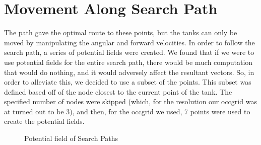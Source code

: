\documentclass{article}
\begin{document}
\section{Movement Along Search Path}
\label{movement_along}
The path gave the optimal route to these points, but the tanks can only be moved by manipulating the angular and forward velocities.  In order to follow the search path, a series of potential fields were created.  We found that if we were to use potential fields for the entire search path, there would be much computation that would do nothing, and it would adversely affect the resultant vectors.  So, in order to alleviate this, we decided to use a subset of the points.  This subset was defined based off of the node closest to the current point of the tank.  The specified number of nodes were skipped (which, for the resolution our occgrid was at turned out to be 3), and then, for the occgrid we used, 7 points were used to create the potential fields.  
\begin{figure}[h!tb]
	\caption{Potential field of Search Paths}
\end{figure}
\end{document}
